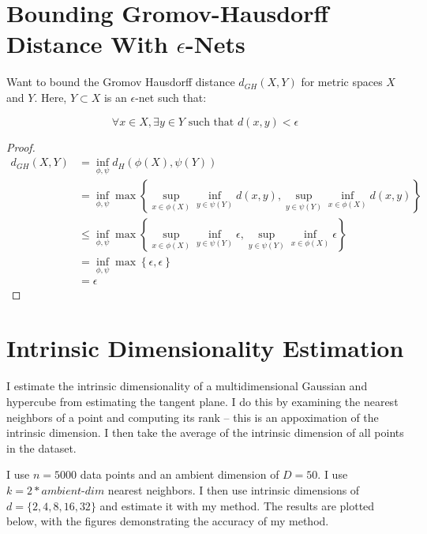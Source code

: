 \documentclass{article}
\begin{document}
\section{Bounding Gromov-Hausdorff Distance With $\epsilon$-Nets}

    Want to bound the Gromov Hausdorff distance $d_{GH}(X,Y)$ for metric spaces $X$ and $Y$. Here, $Y \subset X$ is an $\epsilon$-net such that:

    \begin{equation*}
        \forall x \in X, \exists y \in Y \text{ such that } d(x,y) < \epsilon
    \end{equation*}

    \begin{proof}
        \begin{align*}
            d_{GH}(X,Y) &= \inf_{\phi, \psi} d_H(\phi(X), \psi(Y)) \\
            &= \inf_{\phi, \psi} \max \left\{ \sup_{x \in \phi(X)} \inf_{y \in \psi(Y)} d(x,y), \sup_{y \in \psi(Y)} \inf_{x \in \phi(X)} d(x,y) \right\} \\
            & \leq \inf_{\phi, \psi} \max \left\{ \sup_{x \in \phi(X)} \inf_{y \in \psi(Y)} \epsilon, \sup_{y \in \psi(Y)} \inf_{x \in \phi(X)} \epsilon \right\} \\
            &= \inf_{\phi, \psi} \max \left\{ \epsilon, \epsilon \right\} \\
            &= \epsilon
        \end{align*}
    \end{proof}

\section{Intrinsic Dimensionality Estimation}

    I estimate the intrinsic dimensionality of a multidimensional Gaussian and hypercube from estimating the tangent plane. I do this by examining the nearest neighbors of a point and computing its rank -- this is an appoximation of the intrinsic dimension. I then take the average of the intrinsic dimension of all points in the dataset.
    
    I use $n=5000$ data points and an ambient dimension of $D = 50$. I use $k=2*\textit{ambient-dim}$ nearest neighbors. I then use intrinsic dimensions of $d = \{2, 4, 8, 16, 32 \}$ and estimate it with my method. The results are plotted below, with the figures demonstrating the accuracy of my method.
\end{document}
